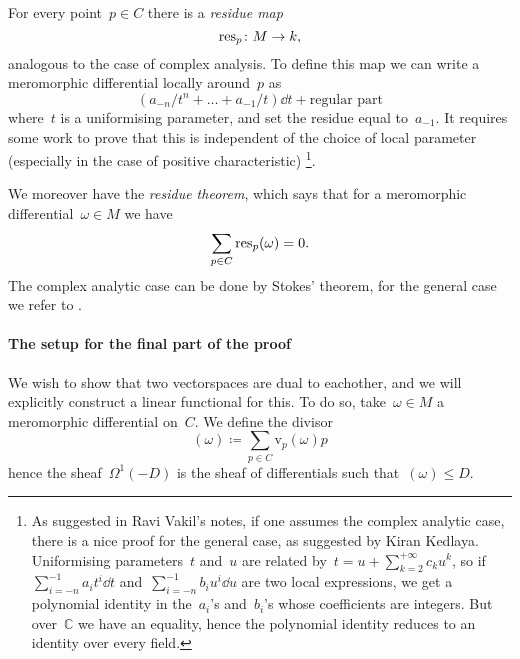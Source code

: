 \documentclass[10pt,a4paper]{article}
\begin{document}
For every point~$p\in C$ there is a \emph{residue map}
\begin{equation}
  \operatorname{res}_p\colon M\to k,
\end{equation}
analogous to the case of complex analysis. To define this map we can write a meromorphic differential locally around~$p$ as
\begin{equation}
  (a_{-n}/t^n+\dotso+a_{-1}/t)\dd t+\text{regular part}
\end{equation}
where~$t$ is a uniformising parameter, and set the residue equal to~$a_{-1}$. It requires some work to prove that this is independent of the choice of local parameter (especially in the case of positive characteristic) \cite{serre-groupes-algebriques-et-corps-de-classes}\footnote{As suggested in Ravi Vakil's notes, if one assumes the complex analytic case, there is a nice proof for the general case, as suggested by Kiran Kedlaya. Uniformising parameters~$t$ and~$u$ are related by~$t=u+\sum_{k=2}^{+\infty}c_ku^k$, so if~$\sum_{i=-n}^{-1}a_it^i\dd t$ and~$\sum_{i=-n}^{-1}b_iu^i\dd u$ are two local expressions, we get a polynomial identity in the~$a_i$'s and~$b_i$'s whose coefficients are integers. But over~$\mathbb{C}$ we have an equality, hence the polynomial identity reduces to an identity over every field.}.

We moreover have the \emph{residue theorem}, which says that for a meromorphic differential~$\omega\in M$ we have
\begin{equation}
  \sum_{p\in C}\operatorname{res}_p(\omega)=0.
\end{equation}
The complex analytic case can be done by Stokes' theorem, for the general case we refer to \cite{serre-groupes-algebriques-et-corps-de-classes}.

\paragraph{The setup for the final part of the proof}
We wish to show that two vectorspaces are dual to eachother, and we will explicitly construct a linear functional for this. To do so, take~$\omega\in M$ a meromorphic differential on~$C$. We define the divisor
\begin{equation}
  (\omega)\coloneqq\sum_{p\in C}\mathrm{v}_p(\omega)p
\end{equation}
hence the sheaf~$\Omega^1(-D)$ is the sheaf of differentials such that~$(\omega)\leq D$.
\end{document}
